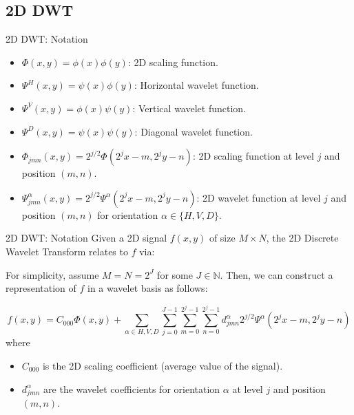 \documentclass[9pt]{beamer}
\begin{document}
\subsection{2D DWT}
\begin{frame}{2D DWT: Notation}
	\begin{itemize}
		\item[] $\Phi(x,y) = \phi(x)\phi(y)$: 2D scaling function.
		\item[] $\Psi^H(x,y) = \psi(x)\phi(y)$: Horizontal wavelet function.
		\item[] $\Psi^V(x,y) = \phi(x)\psi(y)$: Vertical wavelet function.
		\item[] $\Psi^D(x,y) = \psi(x)\psi(y)$: Diagonal wavelet function.
		\item[] $\Phi_{jmn}(x,y) = 2^{j/2} \Phi(2^jx-m, 2^jy-n)$: 2D scaling function at level $j$ and position $(m,n)$.
		\item[] $\Psi^\alpha_{jmn}(x,y) = 2^{j/2} \Psi^\alpha(2^jx-m, 2^jy-n)$: 2D wavelet function at level $j$ and position $(m,n)$ for orientation $\alpha \in \{H, V, D\}$.
	\end{itemize}
\end{frame}
\begin{frame}{2D DWT: Notation}
Given a 2D signal $f(x,y)$ of size $M \times N$, the 2D Discrete Wavelet Transform relates to $f$ via:

For simplicity, assume $M = N = 2^J$ for some $J \in \mathbb{N}$.
Then, we can construct a representation of $f$ in a wavelet basis as follows:


\begin{equation*}
f(x,y) = C_{000}\Phi(x,y)+ \sum_{\alpha \in {H, V, D}} \sum_{j=0}^{J-1} \sum_{m=0}^{2^j-1} \sum_{n=0}^{2^j-1} d^\alpha_{jmn} 2^{j/2} \Psi^\alpha(2^jx-m, 2^jy-n)
\end{equation*}
where
\begin{itemize}
\item[] $C_{000}$ is the 2D scaling coefficient (average value of the signal).
\item[] $d^\alpha_{jmn}$ are the wavelet coefficients for orientation $\alpha$ at level $j$ and position $(m,n)$.
\end{itemize}
\end{frame}
\end{document}
